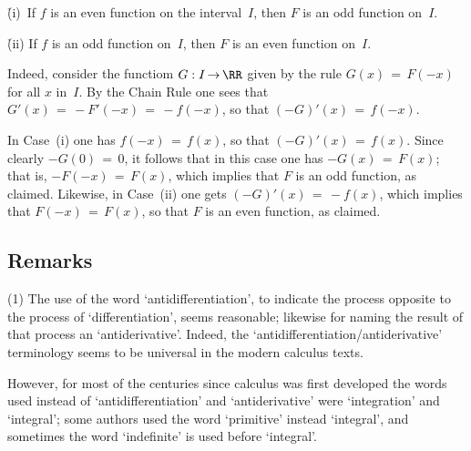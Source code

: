 {\VA

        \h (i)\, If $f$ is an even function on the interval~$I$, then $F$ is an odd function on~$I$.

        \h (ii) If $f$ is an odd function on~$I$, then $F$ is an even function on~$I$.

\VA

\noindent Indeed, consider the functiom $G:I \,{\rightarrow}\, {\RR}$ given by the rule $G(x) \,=\, F(-x)$ for all $x$ in~$I$.
    By the Chain Rule one sees that $G'(x) \,=\, -F'(-x) \,=\, -f(-x)$, so that $(-G)'(x) \,=\, f(-x)$.

        In Case~(i) one has $f(-x) \,=\, f(x)$, so that $(-G)'(x) \,=\, f(x)$. Since clearly $-G(0) \,=\, 0$,
    it follows that in this case one has $-G(x) \,=\, F(x)$; that is, $-F(-x) \,=\, F(x)$, which implies that $F$ is an odd function, as claimed.
    Likewise, in Case~(ii) one gets $(-G)'(x) \,=\, -f(x)$, which implies that $F(-x) \,=\, F(x)$, so that $F$ is an even function, as claimed.

\VV

             \subsection{\small{\bf Remarks}}
            \label{RemrkE45.70}
\V

\hspace*{\parindent}(1) The use of the word `antidifferentiation', to indicate the process opposite to the process of `differentiation', seems reasonable;
    likewise for naming the result of that process an `antiderivative'. Indeed, the `antidifferentiation/antiderivative' terminology
    seems to be universal in the modern calculus texts.

    However, for most of the centuries since calculus was first developed the words used instead of `antidifferentiation' and `antiderivative' were 
    `integration' and `integral'; some authors used the word `primitive' instead `integral', and sometimes the word `indefinite' is used before `integral'.

}
